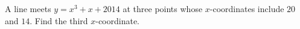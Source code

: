 A line meets $y=x^3+x+2014$ at three points whose $x$-coordinates include $20$ and $14$. Find the third $x$-coordinate.
